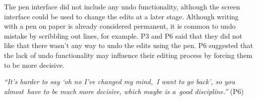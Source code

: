 The pen interface did not include any undo functionality, although the screen interface could be used to change the
edits at a later stage. Although writing with a pen on paper is already considered permanent, it is common to undo
mistake by scribbling out lines, for example. P3 and P6 said that they did not like that there wasn't any way to undo
the edits using the pen. P6 suggested that the lack of undo functionality may influence their editing process by
forcing them to be more decisive.

\textit{``It's harder to say `oh no I've changed my mind, I want to go back', so you almost have to be much more
decisive, which maybe is a good discipline.''} (P6)








